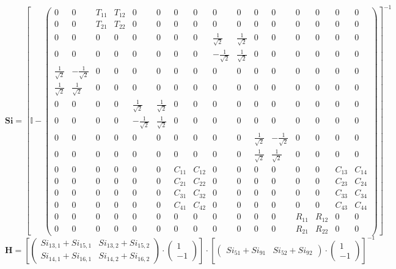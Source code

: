 \[ \mathbf{Si} = \left[ \mathbb{I}  - \left(\begin{smallmatrix} 0 & 0 & T_{11} & T_{12} & 0 & 0 & 0 & 0 & 0 & 0 & 0 & 0 & 0 & 0 & 0 & 0 \\ 0 & 0 & T_{21} & T_{22} & 0 & 0 & 0 & 0 & 0 & 0 & 0 & 0 & 0 & 0 & 0 & 0 \\ 0 & 0 & 0 & 0 & 0 & 0 & 0 & 0 & \frac{1}{\sqrt{2}} & \frac{1}{\sqrt{2}} & 0 & 0 & 0 & 0 & 0 & 0 \\ 0 & 0 & 0 & 0 & 0 & 0 & 0 & 0 & -\frac{1}{\sqrt{2}} & \frac{1}{\sqrt{2}} & 0 & 0 & 0 & 0 & 0 & 0 \\ \frac{1}{\sqrt{2}} & -\frac{1}{\sqrt{2}} & 0 & 0 & 0 & 0 & 0 & 0 & 0 & 0 & 0 & 0 & 0 & 0 & 0 & 0 \\ \frac{1}{\sqrt{2}} & \frac{1}{\sqrt{2}} & 0 & 0 & 0 & 0 & 0 & 0 & 0 & 0 & 0 & 0 & 0 & 0 & 0 & 0 \\ 0 & 0 & 0 & 0 & \frac{1}{\sqrt{2}} & \frac{1}{\sqrt{2}} & 0 & 0 & 0 & 0 & 0 & 0 & 0 & 0 & 0 & 0 \\ 0 & 0 & 0 & 0 & -\frac{1}{\sqrt{2}} & \frac{1}{\sqrt{2}} & 0 & 0 & 0 & 0 & 0 & 0 & 0 & 0 & 0 & 0 \\ 0 & 0 & 0 & 0 & 0 & 0 & 0 & 0 & 0 & 0 & \frac{1}{\sqrt{2}} & -\frac{1}{\sqrt{2}} & 0 & 0 & 0 & 0 \\ 0 & 0 & 0 & 0 & 0 & 0 & 0 & 0 & 0 & 0 & \frac{1}{\sqrt{2}} & \frac{1}{\sqrt{2}} & 0 & 0 & 0 & 0 \\ 0 & 0 & 0 & 0 & 0 & 0 & C_{11} & C_{12} & 0 & 0 & 0 & 0 & 0 & 0 & C_{13} & C_{14} \\ 0 & 0 & 0 & 0 & 0 & 0 & C_{21} & C_{22} & 0 & 0 & 0 & 0 & 0 & 0 & C_{23} & C_{24} \\ 0 & 0 & 0 & 0 & 0 & 0 & C_{31} & C_{32} & 0 & 0 & 0 & 0 & 0 & 0 & C_{33} & C_{34} \\ 0 & 0 & 0 & 0 & 0 & 0 & C_{41} & C_{42} & 0 & 0 & 0 & 0 & 0 & 0 & C_{43} & C_{44} \\ 0 & 0 & 0 & 0 & 0 & 0 & 0 & 0 & 0 & 0 & 0 & 0 & R_{11} & R_{12} & 0 & 0 \\ 0 & 0 & 0 & 0 & 0 & 0 & 0 & 0 & 0 & 0 & 0 & 0 & R_{21} & R_{22} & 0 & 0 \end{smallmatrix}\right) \right]^{-1} \]
\[ \mathbf{H} = \left[ \left(\begin{smallmatrix} Si_{13,1} + Si_{15,1} & Si_{13,2} + Si_{15,2} \\ Si_{14,1} + Si_{16,1} & Si_{14,2} + Si_{16,2} \end{smallmatrix}\right) \cdot \left(\begin{smallmatrix} 1 \\ -1 \end{smallmatrix}\right) \right]\cdot\left[ \left(\begin{smallmatrix} Si_{51} + Si_{91} & Si_{52} + Si_{92} \end{smallmatrix}\right) \cdot \left(\begin{smallmatrix} 1 \\ -1 \end{smallmatrix}\right) \right]^{-1} \]
